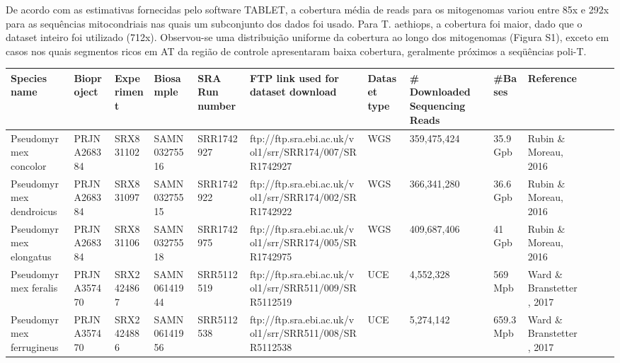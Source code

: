 \documentclass[../DISSERTACAO_MAIN.tex]{subfiles}
\begin{document}
	De acordo com as estimativas fornecidas pelo software TABLET, a cobertura média de reads para os mitogenomas variou entre 85x e 292x para as sequências mitocondriais nas quais um subconjunto dos dados foi usado. Para T. aethiops, a cobertura foi maior, dado que o dataset inteiro foi utilizado (712x). Observou-se uma distribuição uniforme da cobertura ao longo dos mitogenomas (Figura S1), exceto em casos nos quais segmentos ricos em AT da região de controle apresentaram baixa cobertura, geralmente próximos a seqüências poli-T.
	
\begin{landscape}
	{\small	

	\begin{tabular}{| l | l | l | l | l | l | l | l | l | l | l | l | l |}
		\hline

		Species name & Bioproject & Experiment & Biosample & SRA Run number & FTP link used for dataset download & Dataset type & \# Downloaded Sequencing Reads & \#Bases & Reference  \\ \hline

		Pseudomyrmex concolor & PRJNA268384 & SRX831102 & SAMN03275516 & SRR1742927 & ftp://ftp.sra.ebi.ac.uk/vol1/srr/SRR174/007/SRR1742927 & WGS & 359,475,424 & 35.9 Gpb & Rubin \& Moreau, 2016  \\ \hline

		Pseudomyrmex dendroicus & PRJNA268384 & SRX831097 & SAMN03275515 & SRR1742922 & ftp://ftp.sra.ebi.ac.uk/vol1/srr/SRR174/002/SRR1742922 & WGS & 366,341,280 & 36.6 Gpb & Rubin \& Moreau, 2016 \\ \hline

		Pseudomyrmex elongatus & PRJNA268384 & SRX831106 & SAMN03275518 & SRR1742975 & ftp://ftp.sra.ebi.ac.uk/vol1/srr/SRR174/005/SRR1742975 & WGS & 409,687,406 & 41 Gpb & Rubin \& Moreau, 2016 \\ \hline

		Pseudomyrmex feralis & PRJNA357470 & SRX2424867 & SAMN06141944 & SRR5112519 & ftp://ftp.sra.ebi.ac.uk/vol1/srr/SRR511/009/SRR5112519 & UCE & 4,552,328 & 569 Mpb & Ward \& Branstetter, 2017 \\ \hline

		Pseudomyrmex ferrugineus & PRJNA357470 & SRX2424886 & SAMN06141956 & SRR5112538 & ftp://ftp.sra.ebi.ac.uk/vol1/srr/SRR511/008/SRR5112538 & UCE & 5,274,142 & 659.3 Mpb & Ward \& Branstetter, 2017 \\ \hline


\end{tabular}}
\end{landscape}
\end{document}
